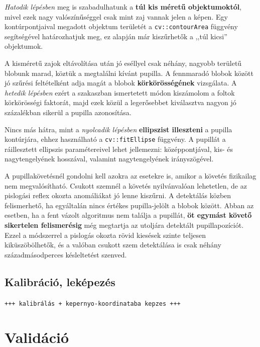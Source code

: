 \emph{Hatodik lépésben} meg is szabadulhatunk a \textbf{túl kis méretű objektumoktól}, mivel ezek nagy valószínűséggel csak mint zaj vannak jelen a képen. Egy kontúrpontjaival megadott objektum területét a \texttt{cv::contourArea} függvény segítségével határozhatjuk meg, ez alapján már kiszűrhetők a ,,túl kicsi'' objektumok.

A kisméretű zajok eltávolítása után jó eséllyel csak néhány, nagyobb területű blobunk marad, köztük a megtalálni kívánt pupilla. A fennmaradó blobok között jó szűrési feltételként adja magát a blobok \textbf{körkörösségének} vizsgálata. A \emph{hetedik lépésben} ezért a  szakaszban ismertetett módon kiszámolom a foltok körkörösségi faktorát, majd ezek közül a legerősebbet kiválasztva nagyon jó százalékban sikerül a pupilla azonosítása.

Nincs más hátra, mint a \emph{nyolcadik lépésben} \textbf{ellipszist illeszteni} a pupilla kontúrjára, ehhez használható a \texttt{cv::fitEllipse} függvény. A pupillát a ráillesztett ellipszis paramétereivel lehet jellemezni: középpontjával, kis- és nagytengelyének hosszával, valamint nagytengelyének irányszögével.

\bigskip

A pupillakövetésnél gondolni kell azokra az esetekre is, amikor a követés fizikailag nem megvalósítható. Csukott szemnél a követés nyilvánvalóan lehetetlen, de az pislogási reflex okozta anomáliákat jó lenne kiszűrni. A detektálás közben felismerhető, ha egyáltalán nincs értékes pupilla-jelölt a blobok között. Abban az esetben, ha a fent vázolt algoritmus nem találja a pupillát, \textbf{öt egymást követő sikertelen felismerésig} még megtartja az utoljára detektált pupillapozíciót. Ezzel a módszerrel a pislogás okozta rövid kiesések szinte teljesen kiküszöbölhetők, és a valóban csukott szem detektálása is csak néhány századmásodperces késleltetést szenved.

\subsection{Kalibráció, leképezés}\label{sect:kalibracio}

\texttt{+++ kalibrálás + kepernyo-koordinataba kepzes +++}

\section{Validáció}\label{sect:validacio}

